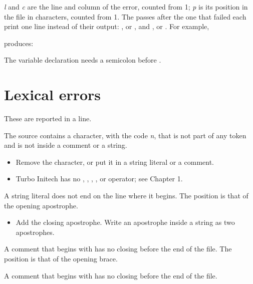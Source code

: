 \textit{l} and \textit{c} are the line and column of the error, counted from
1; \textit{p} is its position in the file in characters, counted from 1.  The
passes after the one that failed each print one line instead of their
output: , 
or , and ,
 or .  For example,


produces:


The variable declaration needs a semicolon before .

\section{Lexical errors}
These are reported in a  line.

The source contains a character, with the code \textit{n}, that is not part
of any token and is not inside a comment or a string.
\begin{itemize}
\item Remove the character, or put it in a string literal or a comment.
\item Turbo Initech has no \code{\%}, \code{/}, \code{\^}, ,
  \code{\$} or \code{\#} operator; see Chapter 1.
\end{itemize}



A string literal does not end on the line where it begins.  The position
is that of the opening apostrophe.
\begin{itemize}
\item Add the closing apostrophe.  Write an apostrophe inside a string as two
  apostrophes.
\end{itemize}

A comment that begins with \code{\{} has no closing \code{\}} before the end
of the file.  The position is that of the opening brace.

A comment that begins with \code{(*} has no closing \code{*)} before the end
of the file.

